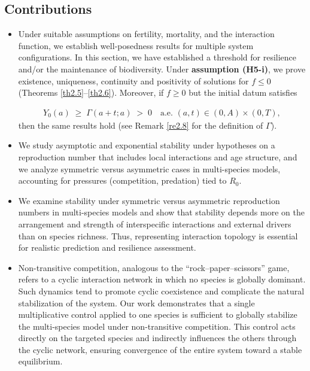 \documentclass[10pt, a4paper]{amsart}
\newcounter{assu}
\theoremstyle{plain}
\theoremstyle{definition}
\theoremstyle{remark}
\numberwithin{equation}{section}
\begin{document}
\subsection*{Contributions}
\begin{itemize}
\item  Under suitable assumptions on fertility, mortality, and the interaction function, we establish well‑posedness results for multiple system configurations. In this section, we have established a threshold for resilience and/or the maintenance of biodiversity. Under {\bf assumption (H5-i)}, we prove existence, uniqueness, continuity and positivity of solutions for $f\le0$ (Theorems \ref{th2.5}–\ref{th2.6}).  Moreover, if $f\ge0$ but the initial datum satisfies

\begin{align}
Y_0(a)\;\ge\;\Gamma(a+t;a)\;>\;0
      \quad\text{a.e. }(a,t)\in(0,A)\times(0,T),
\end{align}
then the same results hold (see Remark \ref{re2.8} for the definition of $\Gamma$).
\item We study asymptotic and exponential stability under hypotheses on a reproduction number that includes local interactions and age structure, and we analyze symmetric versus asymmetric cases in multi-species models, accounting for pressures (competition, predation) tied to $R_0$.
\item We examine stability under symmetric versus asymmetric reproduction numbers in multi-species models and show that stability depends more on the arrangement and strength of interspecific interactions and external drivers than on species richness. Thus, representing interaction topology is essential for realistic prediction and resilience assessment. 
\item  Non-transitive competition, analogous to the “rock–paper–scissors” game, refers to a cyclic interaction network in which no species is globally dominant. Such dynamics tend to promote cyclic coexistence and complicate the natural stabilization of the system. Our work demonstrates that a single multiplicative control applied to one species is sufficient to globally stabilize the multi-species model under non-transitive competition. This control acts directly on the targeted species and indirectly influences the others through the cyclic network, ensuring convergence of the entire system toward a stable equilibrium.


\end{itemize}
\end{document}
